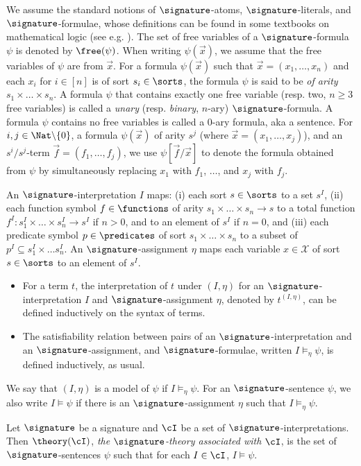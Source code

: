 {We assume the standard notions of $\signature$-atoms, $\signature$-literals, and $\signature$-formulae, whose definitions can be found in some textbooks on mathematical logic (see e.g. \cite{Gal85}). The set of free variables of a $\signature$-formula $\psi$ is denoted by $\free(\psi)$. When writing $\psi(\vec{x})$, we assume that the free variables of $\psi$ are from $\vec{x}$. For a formula  $\psi(\vec{x})$ such that $\vec{x} = (x_1, \dots, x_n)$ and each $x_i$ for $i \in [n]$ is of sort $s_i \in \sorts$, the formula $\psi$ is said to be \emph{of arity} $s_1 \times \dots \times s_n$.
A formula $\psi$ that contains exactly one free variable (resp. two, $n \ge 3$ free variables) is called a \emph{unary} (resp. \emph{binary}, $n$-ary) $\signature$-formula. A formula $\psi$ contains no free variables is called a $0$-ary formula, aka a sentence. For $i, j \in \Nat \backslash \{0\}$, a formula $\psi(\vec{x})$ of arity $s^j$ (where $\vec{x}=(x_1, \dots, x_j)$), and an $s^i/s^j$-term $\vec{f}=(f_1,\dots, f_j)$, we use $\psi[\vec{f}/\vec{x}]$ to denote the formula obtained from $\psi$ by simultaneously replacing $x_1$ with $f_1$, $\dots$, and $x_j$ with $f_j$.

An $\signature$-interpretation $I$ maps: (i) each sort $s \in \sorts$  to a set $s^{I}$, (ii) each function symbol $f \in \functions$ of arity $s_1 \times \ldots \times s_n \rightarrow s$ to a total function $f^I: s_1^I \times \ldots \times s^I_n \rightarrow s^I$ if $n>0$, and to an element of $s^I$ if $n = 0$, and (iii) each predicate symbol $p \in \predicates$ of sort $s_1 \times \ldots \times s_n$ to a  subset of $p^I \subseteq s^I_1 \times \ldots s^I_n$.
An $\signature$-assignment $\eta$ maps each variable $x \in \mathcal{X}$ of sort $s \in \sorts$ to an element of $s^I$.
\begin{itemize}
\item For a term $t$, the interpretation of $t$ under $(I, \eta)$ for an $\signature$-interpretation $I$ and $\signature$-assignment $\eta$, denoted by $t^{(I,\eta)}$, can be defined inductively on the syntax of terms.
\item The satisfiability relation between pairs of an $\signature$-interpretation and an $\signature$-assignment, and $\signature$-formulae, written $I \models_{\eta} \psi$,
is defined inductively, as usual.
\end{itemize}
We say that $(I,\eta)$ is a model of $\psi$ if $I \models_{\eta} \psi$. For an $\signature$-sentence $\psi$, we also write $I \models \psi$ if there is an $\signature$-assignment $\eta$ such that $I \models_\eta \psi$.

Let $\signature$ be a signature and $\cI$ be a set of $\signature$-interpretations. Then $\theory(\cI)$, \emph{the $\signature$-theory associated with $\cI$}, is the set of  $\signature$-sentences $\psi$ such that for each $I \in \cI$, $I \models \psi$.


}
